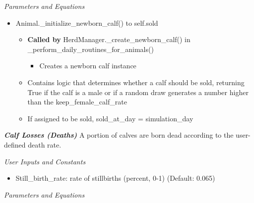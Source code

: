 \documentclass{article}
\begin{document}
\begin{refsection}
\begin{itemize}
         \end{itemize}

         
         \textit{Parameters and Equations}
         \vspace{0.1cm}

         \begin{itemize}
             \item Animal.\_initialize\_newborn\_calf() to self.sold
            \begin{itemize}
                \item \textbf{Called by} HerdManager.\_create\_newborn\_calf() in \_perform\_daily\_routines\_for\_animals()
                \begin{itemize}
                    \item Creates a newborn calf instance 
                \end{itemize}
                \item Contains logic that determines whether a calf should be sold, returning True if the calf is a male or if a random draw generates a number higher than the keep\_female\_calf\_rate 
                \item If assigned to be sold, sold\_at\_day = simulation\_day 
            \end{itemize}
         \end{itemize}






    \textbf{\textit{Calf Losses (Deaths)}} A portion of calves are born dead according to the user-defined death rate. 
    \vspace{0.2cm}

         \textit{User Inputs and Constants}
         \vspace{0.1cm}

         \begin{itemize}
             \item Still\_birth\_rate: rate of stillbirths (percent, 0-1) (Default: 0.065)

         \end{itemize}

         \textit{Parameters and Equations}
         \vspace{0.1cm}
    

\end{refsection}
\end{document}

